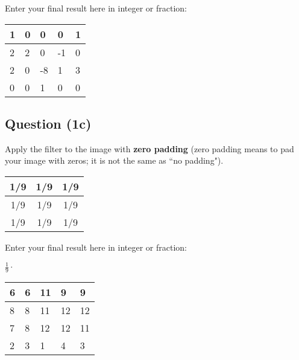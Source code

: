 \documentclass[12pt]{article}
\begin{document}
\noindent Enter your final result here in integer or fraction:

\begin{center}
\begin{tabular}{|l|l|l|l|l|}
\hline
1 & 0 & 0 & 0 & 1 \\ \hline
2 & 2 & 0 & -1 & 0 \\ \hline
2 & 0 & -8 & 1 & 3 \\ \hline
0 & 0 & 1 & 0 & 0 \\ \hline
\end{tabular}
\end{center}

\newpage

\subsection*{Question (1c)} Apply the filter to the image with \textbf{zero padding} (zero padding means to pad your image with zeros; it is not the same as ``no padding").
\begin{center}
\begin{tabular}{|c|c|c|}
\hline
1/9  & 1/9 & 1/9 \\ \hline
1/9  & 1/9 & 1/9 \\ \hline
1/9  & 1/9 & 1/9 \\ \hline
\end{tabular}
\end{center}

\noindent Enter your final result here in integer or fraction:

\begin{center}$\frac{1}{9}\cdot$
\begin{tabular}{|l|l|l|l|l|}
\hline
6 &6 & 11 & 9 & 9\\ \hline
8 & 8 & 11 & 12 & 12 \\ \hline
7& 8 & 12 & 12 & 11 \\ \hline
2 & 3 & 1 & 4 & 3 \\ \hline
\end{tabular}
\end{center}
\end{document}
